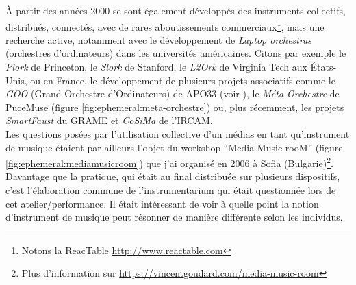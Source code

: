 \noindent À partir des années 2000 se sont également développés des instruments collectifs, distribués, connectés, avec de rares aboutissements commerciaux\footnote{Notons la ReacTable \url{http://www.reactable.com}}, mais une recherche active, notamment avec le développement de \textit{Laptop orchestras} (orchestres d'ordinateurs) dans les universités américaines. Citons par exemple le \textit{Plork} de Princeton, le \textit{Slork} de Stanford, le \textit{L2Ork} de Virginia Tech aux États-Unis, ou en France, le développement de plusieurs projets associatifs comme le \textit{GOO} (Grand Orchestre d'Ordinateurs) de \gls{APO33} (voir \cite{apo33_lorchestre_2003}), le \textit{Méta-Orchestre} de PuceMuse (figure \ref{fig:ephemeral:meta-orchestre}) ou, plus récemment, les projets \textit{SmartFaust} du \gls{GRAME} et \textit{CoSiMa} de l'\gls{IRCAM}.\\
\indent Les questions posées par l'utilisation collective d'un médias en tant qu'instrument de musique étaient par ailleurs l'objet du workshop ``Media Music rooM'' (figure \ref{fig:ephemeral:mediamusicroom}) que j'ai organisé en 2006 à Sofia (Bulgarie)\footnote{Plus d'information sur \url{https://vincentgoudard.com/media-music-room}}. Davantage que la pratique, qui était au final distribuée sur plusieurs dispositifs, c'est l'élaboration commune de l'instrumentarium qui était questionnée lors de cet atelier/performance. Il était intéressant de voir à quelle point la notion d'instrument de musique peut résonner de manière différente selon les individus.\\
